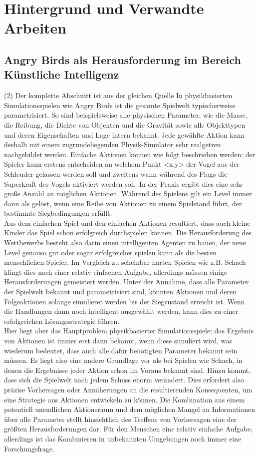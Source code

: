 \section{Hintergrund und Verwandte Arbeiten}

\subsection{Angry Birds als Herausforderung im Bereich Künstliche Intelligenz} (2) Der komplette Abschnitt ist aus der gleichen Quelle
In physikbasierten Simulationsspielen wie Angry Birds ist die gesamte Spielwelt typischerweise parametrisiert. So sind beispielsweise alle physischen Parameter, wie die Masse, die Reibung, die Dichte von Objekten und die Gravität sowie alle Objekttypen und deren Eigenschaften und Lage intern bekannt. Jede gewählte Aktion kann deshalb mit einem zugrundeliegenden Physik-Simulator sehr realgetreu nachgebildet werden. Einfache Aktionen können wie folgt beschrieben werden: der Spieler kann erstens entscheiden an welchem Punkt <x,y> der Vogel aus der Schleuder gelassen werden soll und zweitens wann während des Flugs die Superkraft des Vogels aktiviert werden soll. In der Praxis ergibt dies eine sehr große Anzahl an möglichen Aktionen. Während des Spielens gilt ein Level immer dann als gelöst, wenn eine Reihe von Aktionen zu einem Spielstand führt, der bestimmte Siegbedingungen erfüllt.\\
Aus dem einfachen Spiel und den einfachen Aktionen resultiert, dass auch kleine Kinder das Spiel schon erfolgreich durchspielen können. Die Herausforderung des Wettbewerbs besteht also darin einen intelligenten Agenten zu bauen, der neue Level genauso gut oder sogar erfolgreicher spielen kann als die besten menschlichen Spieler. Im Vergleich zu scheinbar harten Spielen wie z.B. Schach klingt dies nach einer relativ einfachen Aufgabe, allerdings müssen einige Herausforderungen gemeistert werden. Unter der Annahme, dass alle Parameter der Spielwelt bekannt und parametrisiert sind, könnten Aktionen und deren Folgeaktionen solange simulieret werden bis der Siegzustand erreicht ist. Wenn die Handlungen dann noch intelligent ausgewählt werden, kann dies zu einer erfolgreichen Lösungsstrategie führen.\\
Hier liegt aber das Hauptproblem physikbasierter Simulationsspiele: das Ergebnis von Aktionen ist immer erst dann bekannt, wenn diese simuliert wird, was wiederum bedeutet, dass auch alle dafür benötigten Parameter bekannt sein müssen. Es liegt also eine andere Grundlage vor als bei Spielen wie Schach, in denen die Ergebnisse jeder Aktion schon im Voraus bekannt sind. Hinzu kommt, dass sich die Spielwelt nach jedem Schuss enorm verändert. Dies erfordert also präzise Vorhersagen oder Annäherungen an die resultierenden Konsequenten, um eine Strategie aus Aktionen entwickeln zu können. Die Kombination aus einem potentiell unendlichen Aktionsraum und dem möglichen Mangel an Informationen über alle Parameter stellt hinsichtlich des Treffens von Vorhersagen eine der größten Herausforderungen dar. Für den Menschen eine relativ einfache Aufgabe, allerdings ist das Kombinieren in unbekannten Umgebungen noch immer eine Forschungsfrage.\\
